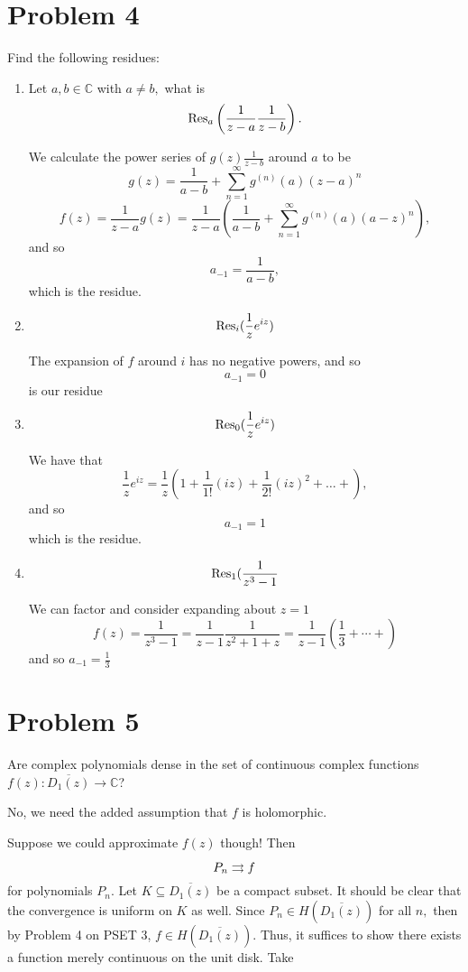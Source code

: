 \documentclass[11pt]{article}
\newcommand{\bbC}{\mathbb{C}}
\begin{document}
\section*{Problem 4}
\begin{problem}
    Find the following residues:
    \begin{enumerate}
        \item Let $a,b \in \bbC$ with $a\neq b,$ what is 
        \[\Res_a \left(\frac{1}{z - a}\frac{1}{z-b}\right).\]
        \begin{solution}
We calculate the power series of $g(z )\frac{1}{z-b}$ around $a$ to be 
\[g(z) = \frac{1}{a-b} + \sum_{n=1}^\infty g^{(n)}(a)(z-a)^n\]
\[f(z) = \frac{1}{z-a} g(z) = \frac{1}{z-a}\left(\frac{1}{a-b} + \sum_{n=1}^\infty g^{(n)}(a)(a - z)^n\right),\] and so 
\[a_{-1} = \frac{1}{a-b},\] which is the residue.
\end{solution}
\item 
\[\Res_i (\frac{1}{z}e^{iz})\]
\begin{solution}
The expansion of $f$ around $i$ has no negative powers, and so \[a_{-1} = 0\] is our residue
\end{solution}
\item 
\[\Res_0 (\frac{1}{z}e^{iz})\]
\begin{solution}
    We have that 
    \[\frac{1}{z}e^{iz} = \frac{1}{z}(1 + \frac{1}{1!} (iz)+ \frac{1}{2!}(iz)^2 + \dots + ),\] and so 
    \[a_{-1} = 1\] which is the residue. 
    \end{solution}
    \item 
\[\Res_1 (\frac{1}{z^3 - 1}\]
\begin{solution}
We can factor and consider expanding about $z = 1$ 
\[f(z) = \frac{1}{z^3 - 1} = \frac{1}{z-1}\frac{1}{z^2 + 1 + z} = \frac{1}{z-1}\left(\frac{1}{3} + \cdots + \right)\] and so $a_{-1} = \frac{1}{3}$
\end{solution}

    \end{enumerate}
\end{problem}

\section*{Problem 5}
\begin{problem}
    Are complex polynomials dense in the set of continuous complex functions $f(z): \overline{D_1(z)} \to \bbC$?
\end{problem}
\begin{solution}
No, we need the added assumption that $f$ is holomorphic. 

Suppose we could approximate $f(z)$ though! Then 
\[P_n\overset{}{\rightrightarrows} f\] for polynomials $P_n.$ Let $K \subseteq \overline{D_1(z)}$ be a compact subset. It should be clear that the convergence is uniform on $K$ as well. Since $P_n \in H(\overline{D_1(z)})$ for all $n,$ then by Problem 4 on PSET 3, $f \in H(\overline{D_1(z)}).$ Thus, it suffices to show there exists a function merely continuous on the unit disk. Take 
\end{solution}
\end{document}

